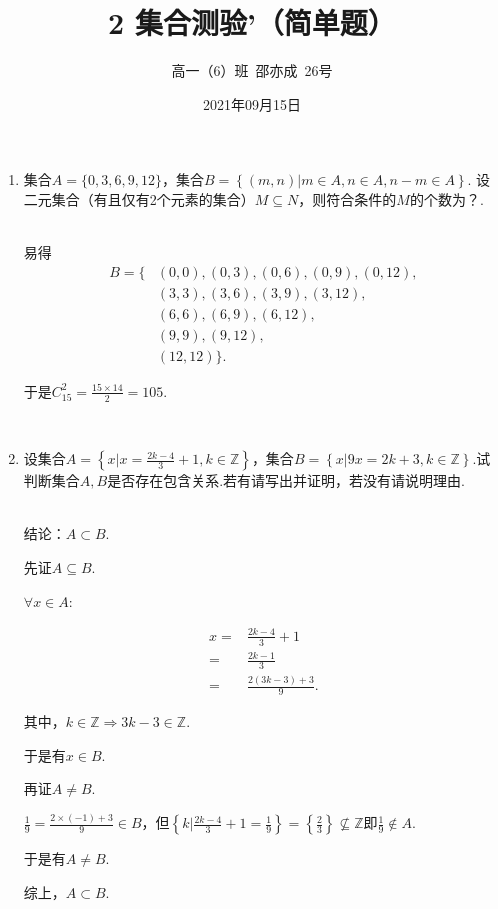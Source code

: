 \documentclass[8pt]{article}
\author{高一（6）班\ 邵亦成\ 26号}
\title{2 集合测验'（简单题）}
\date{2021年09月15日}
\begin{document}
	\maketitle

	\begin{enumerate}
		
		\item
			集合$A=\{0,3,6,9,12\}$，集合$B=\left\{\left(m,n\right)|m\in A, n\in A, n-m \in A\right\}$. 设二元集合（有且仅有2个元素的集合）$M\subseteq N$，则符合条件的$M$的个数为？.

			~\\
			易得
			$$
			\begin{aligned}
			B=\{&(0,0),(0,3),(0,6),(0,9),(0,12),\\
			&(3,3),(3,6),(3,9),(3,12),\\
			&(6,6),(6,9),(6,12),\\
			&(9,9),(9,12),\\
			&(12,12)\}.
			\end{aligned}
			$$

			于是$C_{15}^2=\frac{15\times14}{2}=105$.

		~\\

		\item
			设集合$A=\left\{x|x=\frac{2k-4}{3}+1,k\in\mathbb{Z}\right\}$，集合$B=\left\{x|9x=2k+3,k\in\mathbb{Z}\right\}$.试判断集合$A,B$是否存在包含关系.若有请写出并证明，若没有请说明理由.

			~\\
			结论：$A\subset B$.

			先证$A\subseteq B$.

			$\forall x\in A$:

			$$
			\begin{aligned}
			x=&\frac{2k-4}{3}+1\\
			=&\frac{2k-1}{3}\\
			=&\frac{2(3k-3)+3}{9}.
			\end{aligned}
			$$

			其中，$k\in \mathbb{Z}\Rightarrow 3k-3\in \mathbb{Z}$.

			于是有$x\in B$.

			再证$A\neq B$.

			$\frac{1}{9}=\frac{2\times (-1) + 3}{9}\in B$，但$\left\{k|\frac{2k-4}{3}+1=\frac{1}{9}\right\}=\left\{\frac{2}{3}\right\}\nsubseteq \mathbb{Z}$即$\frac{1}{9}\notin A$.

			于是有$A\neq B$.

			综上，$A\subset B$.

	\end{enumerate}
\end{document}
